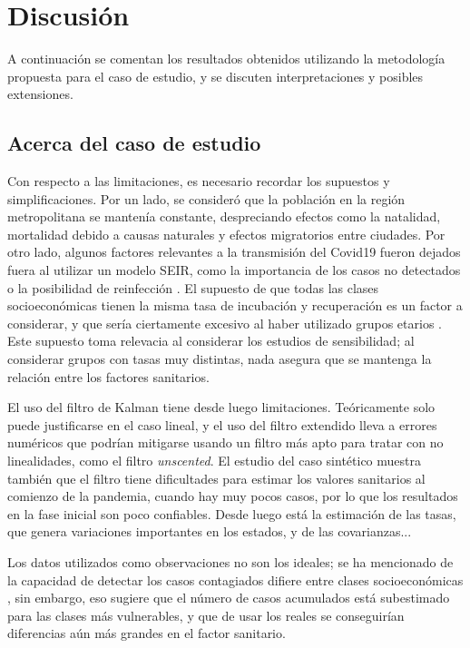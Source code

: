\chapter{Discusión} \label{chap:discus}

A continuación se comentan los resultados obtenidos utilizando la metodología propuesta para el caso de estudio, y se discuten interpretaciones y posibles extensiones.

\section{Acerca del caso de estudio}

Con respecto a las limitaciones, es necesario recordar los supuestos y simplificaciones. Por un lado, se consideró que la población en la región metropolitana se mantenía constante, despreciando efectos como la natalidad, mortalidad debido a causas naturales y efectos migratorios entre ciudades. Por otro lado, algunos factores relevantes a la transmisión del Covid19 fueron dejados fuera al utilizar un modelo SEIR, como la importancia de los casos no detectados \cite{Li2020c} o la posibilidad de reinfección \cite{}. El supuesto de que todas las clases socioeconómicas tienen la misma tasa de incubación y recuperación es un factor a considerar, y que sería ciertamente excesivo al haber utilizado grupos etarios \cite{}. Este supuesto toma relevacia al considerar los estudios de sensibilidad; al considerar grupos con tasas muy distintas, nada asegura que se mantenga la relación entre los factores sanitarios.

El uso del filtro de Kalman tiene desde luego limitaciones. Teóricamente solo puede justificarse en el caso lineal, y el uso del filtro extendido lleva a errores numéricos que podrían mitigarse usando un filtro más apto para tratar con no linealidades, como el filtro \textit{unscented}. El estudio del caso sintético muestra también que el filtro tiene dificultades para estimar los valores sanitarios al comienzo de la pandemia, cuando hay muy pocos casos, por lo que los resultados en la fase inicial son poco confiables. Desde luego está la estimación de las tasas, que genera variaciones importantes en los estados, y de las covarianzas... 

Los datos utilizados como observaciones no son los ideales; se ha mencionado de la capacidad de detectar los casos contagiados difiere entre clases socioeconómicas \cite{Mena2021}, sin embargo, eso sugiere que el número de casos acumulados está subestimado para las clases más vulnerables, y que de usar los reales se conseguirían diferencias aún más grandes en el factor sanitario.

